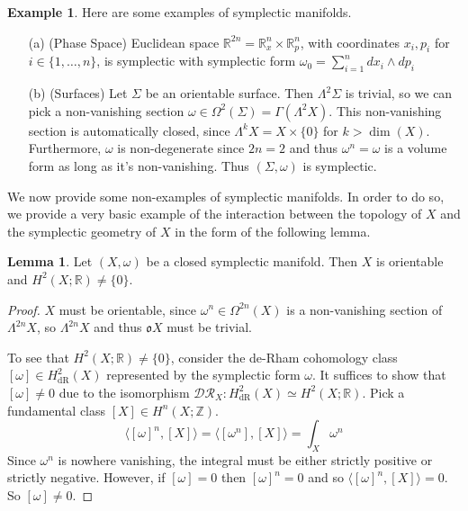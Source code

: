 \documentclass[12pt]{article}
\theoremstyle{definition}
\newtheorem{example}[theorem]{Example}
\numberwithin{equation}{section}
\newtheorem{lemma}[theorem]{Lemma}
\newcommand{\R}{{\mathbb R}}
\newcommand{\Z}{{\mathbb Z}}
\newcommand{\op}{\operatorname}
\begin{document}
\begin{example} Here are some examples of symplectic manifolds.
\begin{enumerate}
	\item[(a)] (Phase Space) Euclidean space $\R^{2n} = \R^n_x \times \R^n_p$, with coordinates $x_i,p_i$ for $i \in \{1,\dots,n\}$, is symplectic with symplectic form $\omega_0 = \sum_{i=1}^n dx_i \wedge dp_i$
	\item[(b)] (Surfaces) Let $\Sigma$ be an orientable surface. Then $\Lambda^2\Sigma$ is trivial, so we can pick a non-vanishing section $\omega \in \Omega^2(\Sigma) = \Gamma(\Lambda^2 X)$. This non-vanishing section is automatically closed, since $\Lambda^kX = X \times \{0\}$ for $k > \op{dim}(X)$. Furthermore, $\omega$ is non-degenerate since $2n = 2$ and thus $\omega^n = \omega$ is a volume form as long as it's non-vanishing. Thus $(\Sigma,\omega)$ is symplectic.
\end{enumerate}
\end{example}

We now provide some non-examples of symplectic manifolds. In order to do so, we provide a very basic example of the interaction between the topology of $X$ and the symplectic geometry of $X$ in the form of the following lemma.

\begin{lemma} \label{lem:homology_of_symplectic_manifold} Let $(X,\omega)$ be a closed symplectic manifold. Then $X$ is orientable and $H^2(X;\R) \neq \{0\}$.
\end{lemma}

\begin{proof} $X$ must be orientable, since $\omega^n \in \Omega^{2n}(X)$ is a non-vanishing section of $\Lambda^{2n}X$, so $\Lambda^{2n}X$ and thus $\mathfrak{o}X$ must be trivial.

To see that $H^2(X;\R) \neq \{0\}$, consider the de-Rham cohomology class $[\omega] \in H^2_{\op{dR}}(X)$ represented by the symplectic form $\omega$. It suffices to show that $[\omega] \neq 0$ due to the isomorphism $\mathcal{DR}_X:H^2_{\op{dR}}(X) \simeq H^2(X;\R)$. Pick a fundamental class $[X] \in H^n(X;\Z)$. 
\[
\langle [\omega]^n,[X]\rangle = \langle [\omega^n],[X]\rangle = \int_X \omega^n 
\]
Since $\omega^n$ is nowhere vanishing, the integral must be either strictly positive or strictly negative. However, if $[\omega] = 0$ then $[\omega]^n = 0$ and so $\langle [\omega]^n,[X]\rangle = 0$. So $[\omega] \neq 0$.
\end{proof}
\end{document}
